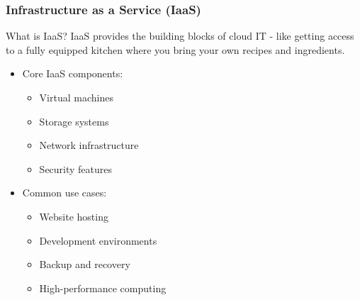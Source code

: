 \documentclass{beamer}
\begin{document}
\begin{frame}
    \frametitle{Infrastructure as a Service (IaaS)}
    
    \begin{block}{What is IaaS?}
        IaaS provides the building blocks of cloud IT - like getting access to a fully equipped kitchen where you bring your own recipes and ingredients.
    \end{block}
    
    \begin{itemize}
        \item Core IaaS components:
        \begin{itemize}
            \item Virtual machines
            \item Storage systems
            \item Network infrastructure
            \item Security features
        \end{itemize}
        
        \item Common use cases:
        \begin{itemize}
            \item Website hosting
            \item Development environments
            \item Backup and recovery
            \item High-performance computing
        \end{itemize}
    \end{itemize}
\end{frame}
\end{document}
